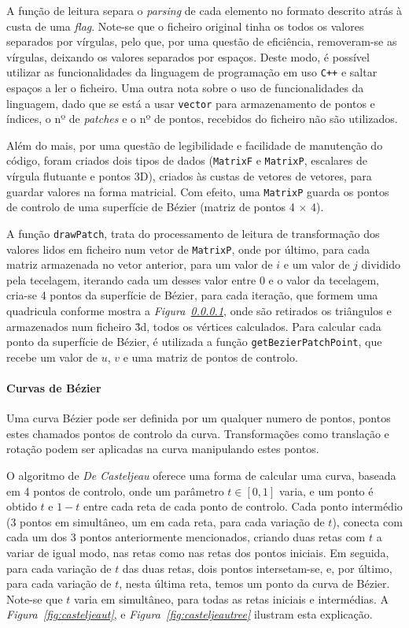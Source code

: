 A função de leitura separa o \emph{parsing} de cada elemento no formato descrito
atrás à custa de uma \emph{flag}. Note-se que o ficheiro original tinha os todos
os valores separados por vírgulas, pelo que, por uma questão de eficiência,
removeram-se as vírgulas, deixando os valores separados por espaços. Deste modo,
é possível utilizar as funcionalidades da linguagem de programação em uso
\texttt{C++} e saltar espaços a ler o ficheiro. Uma outra nota sobre o uso de
funcionalidades da linguagem, dado que se está a usar \texttt{vector} para
armazenamento de pontos e índices, o nº de \emph{patches} e o nº de pontos,
recebidos do ficheiro não são utilizados.  

Além do mais, por uma questão de legibilidade e facilidade de manutenção do
código, foram criados dois tipos de dados (\texttt{MatrixF} e \texttt{MatrixP},
escalares de vírgula flutuante e pontos 3D), criados às custas de vetores de
vetores, para guardar valores na forma matricial. Com efeito, uma
\texttt{MatrixP} guarda os pontos de controlo de uma superfície de Bézier
(matriz de pontos 4 $\times$ 4). 

A função \texttt{drawPatch}, trata do processamento de leitura de transformação
dos valores lidos em ficheiro num vetor de \texttt{MatrixP}, onde por último,
para cada matriz armazenada no vetor anterior, para um valor de $i$ e um valor
de $j$ dividido pela tecelagem, iterando cada um desses valor entre 0 e o valor
da tecelagem, cria-se 4 pontos da superfície de Bézier, para cada iteração, que
formem uma quadricula conforme mostra a \emph{Figura~\ref{}}, onde são retirados
os triângulos e armazenados num ficheiro \.3d, todos os vértices calculados.
Para calcular cada ponto da superfície de Bézier, é utilizada a função
\texttt{getBezierPatchPoint}, que recebe um valor de $u$, $v$ e uma matriz de
pontos de controlo. 

\paragraph{Curvas de Bézier}

Uma curva Bézier pode ser definida por um qualquer numero de pontos, pontos
estes chamados pontos de controlo da curva. Transformações como translação
e rotação podem ser aplicadas na curva manipulando estes pontos. 

O algoritmo de \emph{De Casteljeau} oferece uma forma de calcular uma curva,
baseada em 4 pontos de controlo, onde um parâmetro $t \in [0,1]$ varia, e um
ponto é obtido $t$ e $1-t$ entre cada reta de cada ponto de controlo. Cada ponto
intermédio (3 pontos em simultâneo, um em cada reta, para cada variação de $t$),
conecta com cada um dos 3 pontos anteriormente mencionados, criando duas retas
com $t$ a variar de igual modo, nas retas como nas retas dos pontos iniciais. Em
seguida, para cada variação de $t$ das duas retas, dois pontos intersetam-se, e,
por último, para cada variação de $t$, nesta última reta, temos um ponto da
curva de Bézier. Note-se que $t$ varia em simultâneo, para todas as retas
iniciais e intermédias. A \emph{Figura~\ref{fig:casteljeaut}},
e \emph{Figura~\ref{fig:casteljeautree}} ilustram esta explicação.  

